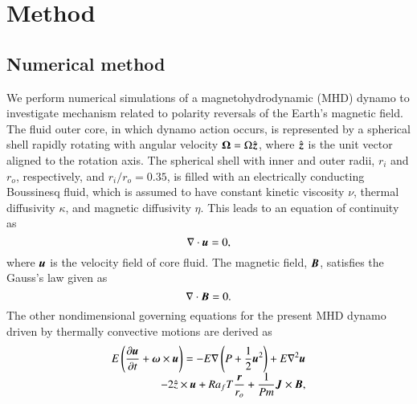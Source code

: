 \section{Method}
\label{section:method}

\subsection{Numerical method}

We perform numerical simulations of a magnetohydrodynamic (MHD) dynamo to investigate mechanism related to polarity reversals of the Earth's magnetic field.
The fluid outer core, in which dynamo action occurs, is represented by a spherical shell rapidly rotating with angular velocity $\mbox{\boldmath$\Omega$} = \Omega \hat{\mbox{\boldmath$z$}}$, where $\hat{\mbox{\boldmath$z$}}$ is the unit vector aligned to the rotation axis.
{\color{red}
The spherical shell with inner and outer radii, $r_i$ and $r_o$, respectively, and $r_i / r_o = 0.35$, is filled with an electrically conducting Boussinesq fluid, which is assumed to have constant kinetic viscosity $\nu$, thermal diffusivity $\kappa$, and magnetic diffusivity $\eta$.
}
This leads to an equation of continuity as
%
\begin{equation}
\nabla \cdot \mbox{\boldmath$u$} = 0,
\label{eq:divu=0}
\end{equation}
%
where $\mbox{\boldmath$u$}$ is the velocity field of core fluid.
The magnetic field, $\mbox{\boldmath$B$}$, satisfies the Gauss's law %
given as
%
\begin{equation}
\nabla \cdot \mbox{\boldmath$B$} = 0.
\label{eq:divB=0}
\end{equation}
%
The other nondimensional governing equations for the present MHD dynamo driven by thermally convective motions are derived as
%
\begin{equation}
\begin{array}{l}
\displaystyle
E \left( \frac{\partial\bvec{u}}{\partial t} +
 \bvec{\omega} \times \bvec{u} \right) =
 - E \nabla \left( P + \frac{1}{2} \bvec{u}^2 \right)
 + E \nabla^2 \bvec{u}
\\
\displaystyle
\hspace*{\fill}
 -2 \hat{z} \times \bvec{u}
 + Ra_f T \frac{\bvec{r}}{r_o}
 + \frac{1}{Pm} \bvec{J} \times \bvec{B} ,
\end{array}
\label{eq:momentum}
\end{equation}
